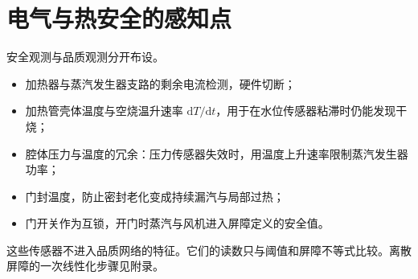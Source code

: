 \section{电气与热安全的感知点}

安全观测与品质观测分开布设。

\begin{itemize}
\item 加热器与蒸汽发生器支路的剩余电流检测，硬件切断；
\item 加热管壳体温度与空烧温升速率 $\mathrm{d}T/\mathrm{d}t$，用于在水位传感器粘滞时仍能发现干烧；
\item 腔体压力与温度的冗余：压力传感器失效时，用温度上升速率限制蒸汽发生器功率；
\item 门封温度，防止密封老化变成持续漏汽与局部过热；
\item 门开关作为互锁，开门时蒸汽与风机进入屏障定义的安全值。
\end{itemize}

这些传感器不进入品质网络的特征。它们的读数只与阈值和屏障不等式比较。离散屏障的一次线性化步骤见附录。
